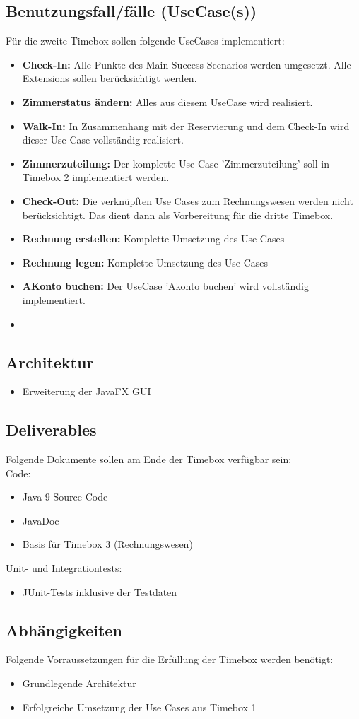 \documentclass[../Pflichtenheft.tex]{subfiles}
\begin{document}
    \subsection{Benutzungsfall/fälle (UseCase(s)) }
    Für die zweite Timebox sollen folgende UseCases implementiert:
    \begin{itemize}
        \item \textbf{Check-In:} Alle Punkte des Main Success Scenarios werden umgesetzt.
        Alle Extensions sollen berücksichtigt werden.
        \item \textbf{Zimmerstatus ändern: } Alles aus diesem UseCase wird realisiert.
        \item \textbf{Walk-In: } In Zusammenhang mit der Reservierung und dem Check-In wird dieser Use Case vollständig realisiert.
        \item \textbf{Zimmerzuteilung: } Der komplette Use Case 'Zimmerzuteilung' soll in Timebox 2 implementiert werden.
        \item \textbf{Check-Out:} Die verknüpften Use Cases zum Rechnungswesen werden nicht berücksichtigt. Das dient dann als Vorbereitung für die dritte Timebox.
        \item \textbf{Rechnung erstellen:} Komplette Umsetzung des Use Cases
        \item \textbf{Rechnung legen:} Komplette Umsetzung des Use Cases
        \item \textbf{AKonto buchen: } Der UseCase 'Akonto buchen' wird vollständig implementiert.
        \item \textbf{}
    \end{itemize}
    \subsection{Architektur}
    \begin{itemize}
        \item Erweiterung der JavaFX GUI
    \end{itemize}
    \subsection{Deliverables}
    Folgende Dokumente sollen am Ende der Timebox verfügbar sein: \\
    Code:
    \begin{itemize}
        \item Java 9 Source Code
        \item JavaDoc
        \item Basis für Timebox 3 (Rechnungswesen)
    \end{itemize}
    Unit- und Integrationtests:
    \begin{itemize}
        \item JUnit-Tests inklusive der Testdaten
    \end{itemize}
    \subsection{Abhängigkeiten}
    Folgende Vorraussetzungen für die Erfüllung der Timebox werden benötigt:
    \begin{itemize}
        \item Grundlegende Architektur
        \item Erfolgreiche Umsetzung der Use Cases aus Timebox 1
    \end{itemize}
\end{document}
